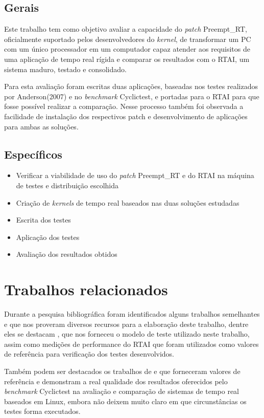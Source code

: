 \subsection{Gerais}
Este trabalho tem como objetivo avaliar a capacidade do \textit{patch} Preempt\_RT, oficialmente
suportado pelos desenvolvedores do \textit{kernel}, de transformar um PC com um único processador em um
computador capaz atender aos requisitos de uma aplicação de tempo real rígida e comparar os
resultados com o RTAI, um sistema maduro, testado e consolidado.

Para esta avaliação foram escritas duas aplicações, baseadas nos testes realizados por
Anderson(2007) e no \textit{benchmark} Cyclictest, e portadas para o RTAI para que fosse possível realizar a
comparação. Nesse processo também foi observada a facilidade de instalação dos respectivos patch e
desenvolvimento de aplicações para ambas as soluções.
\subsection{Específicos}
\begin{itemize}
    \item Verificar a viabilidade de uso do \textit{patch} Preempt\_RT e do RTAI na máquina de testes e distribuição escolhida
    \item Criação de \textit{kernels} de tempo real baseados nas duas soluções estudadas
    \item Escrita dos testes
    \item Aplicação dos testes
    \item Avaliação dos resultados obtidos
\end{itemize}

\section{Trabalhos relacionados}
Durante a pesquisa bibliográfica foram identificados alguns trabalhos semelhantes e que nos proveram diversos recursos para a elaboração deste trabalho, dentre eles se destacam \cite{Anderson2007}, que nos forneceu o modelo de teste utilizado neste trabalho, assim como medições de performance do RTAI que foram utilizados como valores de referência para verificação dos testes desenvolvidos.

Também podem ser destacados os trabalhos de \cite{Litayem2011} e \cite{Hallberg2017} que forneceram valores de referência e demonstram a real qualidade dos resultados oferecidos pelo \textit{benchmark} Cyclictest na avaliação e comparação de sistemas de tempo real baseados em Linux, embora não deixem muito claro em que circunstâncias os testes forma executados.

